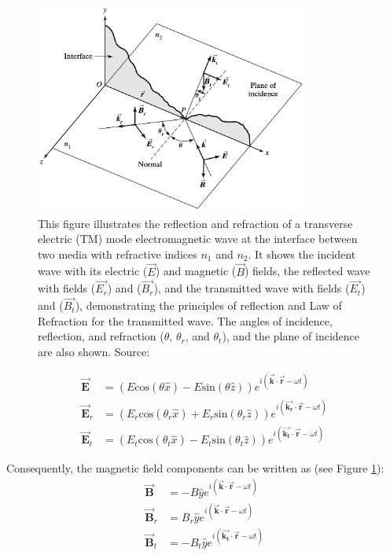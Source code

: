 \begin{figure}[ht!]
  \centering
  \includegraphics[width=0.8\textwidth]{Chapters/Figures/Chapter 2 Figures/Incident, Reflected, and Transmitted Ray for TM Mode.jpg}
  \caption[The transverse electric (TM) set-up]{This figure illustrates the reflection and refraction of a transverse electric (TM) mode electromagnetic wave at the interface between two media with refractive indices $n_1$ and $n_2$. It shows the incident wave with its electric ($\vec{E}$) and magnetic ($\vec{B}$) fields, the reflected wave with fields ($\vec{E_r}$) and ($\vec{B_r}$), and the transmitted wave with fields ($\vec{E_t}$) and ($\vec{B_t}$), demonstrating the principles of reflection and Law of Refraction for the transmitted wave. The angles of incidence, reflection, and refraction ($\theta$, $\theta_r$, and $\theta_t$), and the plane of incidence are also shown. Source: \cite{pedrotti_introduction_2007}}
  \label{fig: The TM set-up}
\end{figure}

\begin{align*} 
\vec{\mathbf{E}} &= (E\mathrm{cos}(\theta \hat{x}) - E\mathrm{sin}(\theta \hat{z})) e^{i(\vec{\mathbf{k}} \cdot \vec{\mathbf{r}} - \omega t)} \\
\vec{\mathbf{E}}_r &= (E_r\mathrm{cos}(\theta_r \hat{x}) + E_r\mathrm{sin}(\theta_r \hat{z})) e^{i(\vec{\mathbf{k_r}} \cdot \vec{\mathbf{r}} - \omega t)} \\ 
\vec{\mathbf{E}}_t &= (E_t\mathrm{cos}(\theta_t \hat{x}) - E_t\mathrm{sin}(\theta_t \hat{z})) e^{i(\vec{\mathbf{k_t}} \cdot \vec{\mathbf{r}} - \omega t)}
\end{align*}

Consequently, the magnetic field components can be written as (see Figure \ref{fig: The TM set-up}):
\begin{align*}
    \vec{\mathbf{B}} &= -B\hat{y} e^{i(\vec{\mathbf{k}} \cdot \vec{\mathbf{r}} - \omega t)} \\
    \vec{\mathbf{B}}_r &= B_r\hat{y} e^{i(\vec{\mathbf{k}} \cdot \vec{\mathbf{r}} - \omega t)} \\
    \vec{\mathbf{B}}_t &= -B_t\hat{y} e^{i(\vec{\mathbf{k_t}} \cdot \vec{\mathbf{r}} - \omega t)} \\
\end{align*}

